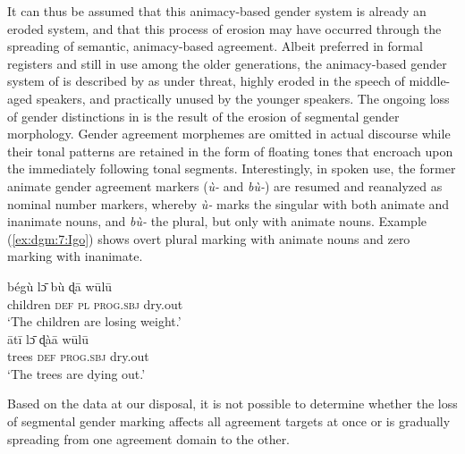 \documentclass[output=collectionpaper]{langsci/langscibook}
\begin{document}
It can thus be assumed that this animacy-based gender system is already an eroded system, and that this process of erosion may have occurred through the spreading of semantic, animacy-based agreement. Albeit preferred in formal registers and still in use among the older generations, the animacy-based gender system of  is described by \citet{Gblem-Poidi2007} as under threat, highly eroded in the speech of middle-aged speakers, and practically unused by the younger speakers. The ongoing loss of gender distinctions in  is the result of the erosion of segmental gender morphology. Gender agreement morphemes are omitted in actual discourse while their tonal patterns are retained in the form of floating tones that encroach upon the immediately following tonal segments. Interestingly, in spoken use, the former animate gender agreement markers (\textit{\`u-} and \textit{b\`u-}) are resumed and reanalyzed as nominal number markers, whereby \textit{\`u-} marks the singular with both animate and inanimate nouns, and \textit{b\`u-} the plural, but only with animate nouns. Example (\ref{ex:dgm:7:Igo}) shows overt plural marking with animate nouns and zero marking with inanimate.
 
\ea\label{ex:dgm:7:Igo}
\ea
\gll b\'eg\`u l\={ɔ} b\`u ɖ\={a} w\={u}l\={u}\\
children \textsc{def} \textsc{pl} \textsc{prog.sbj} dry.out\\
\glt `The children are losing weight.'\\
 
\ex
\gll \={a}t\={i} l\={ɔ} ɖ\`a\={a} w\={u}l\={u}\\
trees \textsc{def} \textsc{prog.sbj} dry.out \\
\glt `The trees are dying out.'
\z
\z

Based on the data at our disposal, it is not possible to determine whether the loss of segmental gender marking affects all agreement targets at once or is gradually spreading from one agreement domain to the other.
\end{document}
